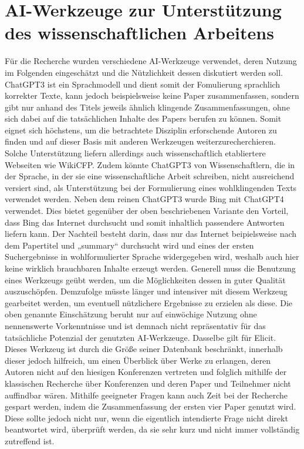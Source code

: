 \documentclass[12pt]{report}
\begin{document}
\chapter{AI-Werkzeuge zur Unterstützung des wissenschaftlichen Arbeitens}
Für die Recherche wurden verschiedene AI-Werkzeuge verwendet, deren Nutzung im Folgenden eingeschätzt und die Nützlichkeit dessen diskutiert werden soll. 
ChatGPT3 ist ein Sprachmodell und dient somit der Fomulierung sprachlich korrekter Texte, kann jedoch beispielsweise keine Paper zusammenfassen, sondern gibt nur anhand des Titels jeweils ähnlich klingende Zusammenfassungen, ohne sich dabei auf die tatsächlichen Inhalte des Papers berufen zu können. Somit eignet sich höchstens, um die betrachtete Disziplin erforschende Autoren zu finden und auf dieser Basis mit anderen Werkzeugen weiterzurecherchieren. Solche Unterstützung liefern allerdings auch wissenschaftlich
etabliertere Webseiten wie WikiCFP. Zudem könnte ChatGPT3 von Wissenschaftlern, die in der Sprache, in der sie eine wissenschaftliche Arbeit schreiben, nicht ausreichend versiert sind, als Unterstützung bei der Formulierung eines wohlklingenden Texts verwendet werden.
Neben dem reinen ChatGPT3 wurde Bing mit ChatGPT4 verwendet. Dies bietet gegenüber der oben beschriebenen Variante den Vorteil, dass Bing das Internet durchsucht und somit inhaltlich passendere Antworten liefern kann. Der Nachteil besteht darin, dass nur das Internet beipielsweise nach dem Papertitel und „summary“ durchsucht wird und eines der ersten Suchergebnisse in wohlformulierter Sprache widergegeben wird, weshalb auch hier keine wirklich brauchbaren Inhalte erzeugt werden.
Generell muss die Benutzung eines Werkzeugs geübt werden, um die Möglichkeiten dessen in guter Qualität auszuschöpfen. Demzufolge  müsste länger und intensiver mit diesem Werkzeug gearbeitet werden, um eventuell nützlichere Ergebnisse zu erzielen als diese. Die oben genannte Einschätzung beruht nur auf einwöchige Nutzung ohne nennenswerte Vorkenntnisse und ist demnach nicht repräsentativ für das tatsächliche Potenzial der genutzten AI-Werkzeuge.
Dasselbe gilt für Elicit. Dieses Werkzeug ist durch die Größe seiner Datenbank beschränkt, innerhalb dieser jedoch hilfreich, um einen Überblick über Werke zu erlangen, deren Autoren nicht auf den hiesigen Konferenzen vertreten und folglich mithilfe der klassischen Recherche über Konferenzen und deren Paper und Teilnehmer nicht auffindbar wären. Mithilfe geeigneter Fragen kann auch Zeit bei der Recherche gespart werden, indem die Zusammenfassung der ersten vier Paper genutzt wird. Diese sollte jedoch nicht nur, wenn die eigentlich intendierte Frage nicht direkt beantwortet wird, überprüft werden, da sie sehr kurz und nicht immer vollständig zutreffend ist.



\end{document}
